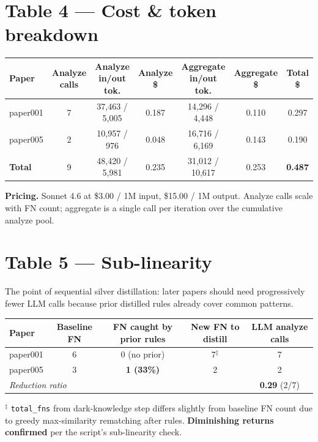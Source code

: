 \documentclass[10pt]{article}
\begin{document}
\section*{Table 4 --- Cost \& token breakdown}

\medskip
\begin{tabular}{lcccccc}
\toprule
\textbf{Paper} & \textbf{Analyze calls} & \textbf{Analyze in/out tok.} & \textbf{Analyze \$} & \textbf{Aggregate in/out tok.} & \textbf{Aggregate \$} & \textbf{Total \$} \\
\midrule
paper001 & 7 & 37{,}463 / 5{,}005 & 0.187 & 14{,}296 / 4{,}448 & 0.110 & 0.297 \\
paper005 & 2 & 10{,}957 / \phantom{0}\phantom{0}976 & 0.048 & 16{,}716 / 6{,}169 & 0.143 & 0.190 \\
\midrule
\textbf{Total} & 9 & 48{,}420 / 5{,}981 & 0.235 & 31{,}012 / 10{,}617 & 0.253 & \textbf{0.487} \\
\bottomrule
\end{tabular}

\medskip
\noindent
{\small \textbf{Pricing.} Sonnet 4.6 at \$3.00 / 1M input, \$15.00 / 1M output. Analyze calls scale with FN count; aggregate is a single call per iteration over the cumulative analyze pool.}

\section*{Table 5 --- Sub-linearity}

\noindent
The point of sequential silver distillation: later papers should need progressively fewer LLM calls because prior distilled rules already cover common patterns.

\medskip
\begin{tabular}{lcccc}
\toprule
\textbf{Paper} & \textbf{Baseline FN} & \textbf{FN caught by prior rules} & \textbf{New FN to distill} & \textbf{LLM analyze calls} \\
\midrule
paper001 & 6 & 0 (no prior) & 7$^\ddagger$ & 7 \\
paper005 & 3 & \textbf{1 (33\%)} & 2 & 2 \\
\midrule
\multicolumn{2}{l}{\textit{Reduction ratio}} & & & \textbf{0.29} (2/7) \\
\bottomrule
\end{tabular}

\medskip
\noindent
{\small $^\ddagger$ \texttt{total\_fns} from dark-knowledge step differs slightly from baseline FN count due to greedy max-similarity rematching after rules. \textbf{Diminishing returns confirmed} per the script's sub-linearity check.}
\end{document}
